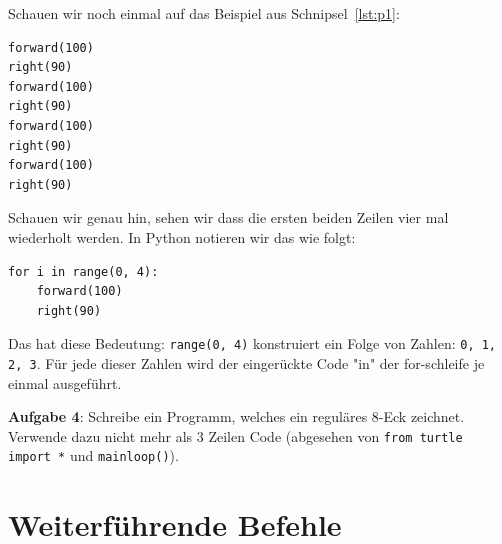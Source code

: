 \documentclass[ngerman,11pt]{article}
\begin{document}
    Schauen wir noch einmal auf das Beispiel aus Schnipsel~\ref{lst:p1}:

    \begin{lstlisting}[caption=Rechteck]
forward(100)
right(90)
forward(100)
right(90)
forward(100)
right(90)
forward(100)
right(90)
    \end{lstlisting}

    Schauen wir genau hin, sehen wir dass die ersten beiden Zeilen vier mal wiederholt werden.
    In Python notieren wir das wie folgt:

    \begin{lstlisting}[caption=Rechteck mit Schleife]
for i in range(0, 4):
    forward(100)
    right(90)
    \end{lstlisting}

    Das hat diese Bedeutung:
    \lstinline{range(0, 4)} konstruiert ein Folge von Zahlen: \lstinline{0, 1, 2, 3}.
    Für jede dieser Zahlen wird der eingerückte Code "in" der for-schleife je einmal ausgeführt.



    \vspace{1cm}

    \textbf{Aufgabe 4}: Schreibe ein Programm, welches ein reguläres 8-Eck zeichnet.
    Verwende dazu nicht mehr als 3 Zeilen Code (abgesehen von \lstinline{from turtle import *} und \lstinline{mainloop()}).


    \newpage


    \section{Weiterführende Befehle}
\end{document}
